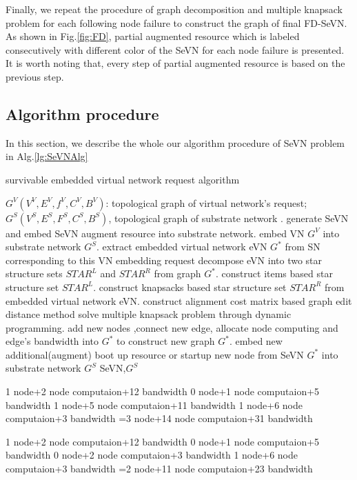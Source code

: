 Finally, we repeat the procedure of graph decomposition and multiple knapsack problem for each following node failure to construct the graph of final FD-SeVN. As shown in Fig.\ref{fig:FD}, partial augmented resource which is labeled consecutively with different color of the SeVN for each node failure is presented. It is worth noting that, every step of partial augmented resource is based on the previous step.

\subsection{Algorithm procedure}
In this section, we describe the whole our algorithm procedure of SeVN problem in Alg.\ref{lg:SeVNAlg}
\begin{algorithm}
\label{alg:SeVNAlg}
\caption{survivable embedded virtual network request algorithm}
\begin{algorithmic}[1]
\REQUIRE $G^V (V^V,E^V,f^V,C^V,B^V)$:  topological graph of virtual network's request; $G^S (V^S,E^S,F^S,C^S,B^S)$, topological graph of substrate network .
\ENSURE generate SeVN and embed SeVN augment resource into substrate network.
\STATE embed VN $G^V$ into substrate network $G^S$.
\STATE extract embedded virtual network eVN $G^*$ from SN corresponding to this VN embedding request
\STATE decompose eVN into two star structure sets $STAR^L$ and $STAR^R$ from graph $G^*$.
\STATE construct items based star structure set $STAR^L$.
\STATE construct knapsacks based star structure set $STAR^R$ from embedded virtual network eVN.
\STATE construct alignment cost matrix based graph edit distance method\cite{sanfeliu1983distance}
\STATE solve multiple knapsack problem through dynamic programming.
\STATE add new nodes ,connect new edge, allocate node computing and edge's bandwidth into $G^*$ to construct new graph $G^*$.
\ENDFOR
\STATE embed new additional(augment) boot up resource or startup new node from SeVN $G^*$ into substrate network $G^S$
\RETURN SeVN,$G^S$
\end{algorithmic}
\end{algorithm}

1 node+2 node computaion+12 bandwidth
0 node+1 node computaion+5 bandwidth
1 node+5 node computaion+11 bandwidth
1 node+6 node computaion+3 bandwidth
=3 node+14 node computaion+31 bandwidth

1 node+2 node computaion+12 bandwidth
0 node+1 node computaion+5 bandwidth
0 node+2 node computaion+3 bandwidth
1 node+6 node computaion+3 bandwidth
=2 node+11 node computaion+23 bandwidth
